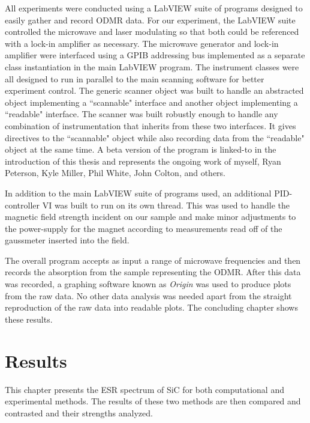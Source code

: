 \documentclass[oneside, noacknowlegments]{BYUPhys}
\begin{document}
All experiments were conducted using a LabVIEW suite of programs designed to easily gather and record ODMR data. For our experiment, the LabVIEW suite controlled the microwave and laser modulating so that both could be referenced with a lock-in amplifier as necessary. The microwave generator and lock-in amplifier were interfaced using a GPIB addressing bus implemented as a separate class instantiation in the main LabVIEW program. The instrument classes were all designed to run in parallel to the main scanning software for better experiment control. The generic scanner object was built to handle an abstracted object implementing a ``scannable" interface and another object implementing a ``readable" interface. The scanner was built robustly enough to handle any combination of instrumentation that inherits from these two interfaces. It gives directives to the ``scannable" object while also recording data from the ``readable" object at the same time. A beta version of the program is linked-to in the introduction of this thesis and represents the ongoing work of myself, Ryan Peterson, Kyle Miller, Phil White, John Colton, and others.

In addition to the main LabVIEW suite of programs used, an additional PID-controller VI was built to run on its own thread. This was used to handle the magnetic field strength incident on our sample and make minor adjustments to the power-supply for the magnet according to measurements read off of the gaussmeter inserted into the field.

The overall program accepts as input a range of microwave frequencies and then records the absorption from the sample representing the ODMR. After this data was recorded, a graphing software known as \textit{Origin} was used to produce plots from the raw data. No other data analysis was needed apart from the straight reproduction of the raw data into readable plots. The concluding chapter shows these results.










\chapter{Results}

This chapter presents the ESR spectrum of SiC for both computational and experimental methods. The results of these two methods are then compared and contrasted and their strengths analyzed.
\end{document}
